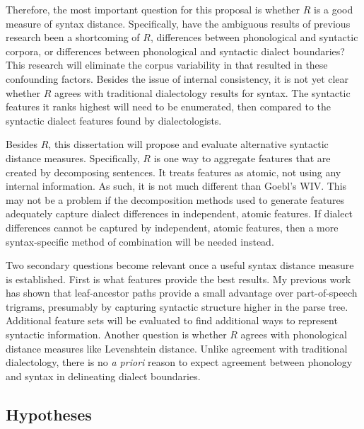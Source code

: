 \documentclass[11pt,letterpaper]{article}
\begin{document}

Therefore, the most important question for this
proposal is whether $R$ is a good measure of syntax
distance. Specifically, have the ambiguous results of previous
research been a shortcoming of $R$, differences between phonological
and syntactic corpora, or differences between phonological and
syntactic dialect boundaries? This research will eliminate the corpus
variability in  that resulted in these
confounding factors. Besides the issue of internal consistency, it is
not yet clear whether $R$ agrees with traditional dialectology results
for syntax. The syntactic features it ranks highest will need to be
enumerated, then compared to the syntactic dialect features found by
dialectologists.

Besides $R$, this dissertation will propose and evaluate alternative
syntactic distance measures. Specifically, $R$ is one way to aggregate
features that are created by decomposing sentences. It treats features
as atomic, not using any internal information. As such, it is not much
different than Goebl's WIV. This may not be a problem if the
decomposition methods used to generate features adequately capture
dialect differences in independent, atomic features. If dialect
differences cannot be captured by independent, atomic features, then a
more syntax-specific method of combination will be needed
instead.

Two secondary questions become relevant once a useful syntax distance
measure is established. First is what features provide the best
results. My previous work has shown that leaf-ancestor paths provide a
small advantage over part-of-speech trigrams, presumably by capturing
syntactic structure higher in the parse tree. Additional feature sets
will be evaluated to find additional ways to represent syntactic
information. Another question is whether $R$ agrees with phonological
distance measures like Levenshtein distance.  Unlike agreement with
traditional dialectology, there is no {\it a priori} reason to expect
agreement between phonology and syntax in delineating dialect
boundaries.


\subsection{Hypotheses}
\end{document}
